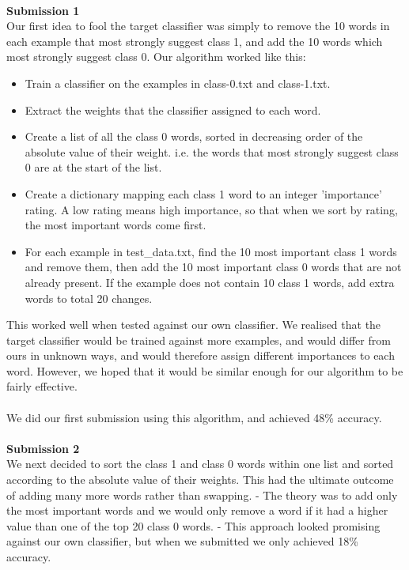 \documentclass{article}
\begin{document}
\\
\textbf{\large Submission 1} \\
Our first idea to fool the target classifier was simply to remove the 10 words in each example that most strongly suggest class 1, and add the 10 words which most strongly suggest class 0. Our algorithm worked like this:
\begin{itemize}
  \item{Train a classifier on the examples in class-0.txt and class-1.txt.}
  \item{Extract the weights that the classifier assigned to each word.}
  \item{Create a list of all the class 0 words, sorted in decreasing order of the absolute value of their weight. i.e. the words that most strongly suggest class 0 are at the start of the list.}
  \item{Create a dictionary mapping each class 1 word to an integer 'importance' rating. A low rating means high importance, so that when we sort by rating, the most important words come first.}
  \item{For each example in test\_data.txt, find the 10 most important class 1 words and remove them, then add the 10 most important class 0 words that are not already present. If the example does not contain 10 class 1 words, add extra words to total 20 changes.}
\end{itemize}
This worked well when tested against our own classifier. We realised that the target classifier would be trained against more examples, and would differ from ours in unknown ways, and would therefore assign different importances to each word. However, we hoped that it would be similar enough for our algorithm to be fairly effective.\\
\\
We did our first submission using this algorithm, and achieved 48\% accuracy. \\
\\
\textbf{\large Submission 2} \\
We next decided to sort the class 1 and class 0 words within one list and sorted according to the absolute value of their weights. This had the ultimate outcome of adding many more words rather than swapping. 
 - The theory was to add only the most important words and we would only remove a word if it had a higher value than one of the top 20 class 0 words.
 - This approach looked promising against our own classifier, but when we submitted we only achieved 18\% accuracy.
\end{document}

